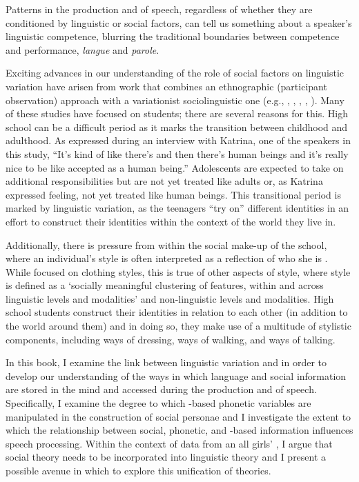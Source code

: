\noindent Patterns in the production and  of speech, regardless of whether they are conditioned by linguistic or social factors, can tell us something about a speaker's linguistic competence, blurring the traditional boundaries between competence and performance, \textit{langue} and \textit{parole}.  

Exciting advances in our understanding of the role of social factors on linguistic variation have arisen from work that combines an ethnographic (participant observation) approach with a variationist sociolinguistic one (e.g., , , , , ).  Many of these studies have focused on  students; there are several reasons for this.  High school can be a difficult period as it marks the transition between childhood and adulthood.  As expressed during an interview with Katrina, one of the speakers in this study, "`It's kind of like there's  and then there's human beings and it's really nice to be like accepted as a human being."'  Adolescents are expected to take on additional responsibilities but are not yet treated like adults or, as Katrina expressed feeling, not yet treated like human beings.  This transitional period is marked by linguistic variation, as the teenagers "`try on"' different identities in an effort to construct their identities within the context of the world they live in.

Additionally, there is pressure from within the social make-up of the school, where an individual's style is often interpreted as a reflection of who she is \cite[2]{pomerantz2008}.  While  focused on clothing styles, this is true of other aspects of style, where style is defined as a `socially meaningful clustering of features, within and across linguistic levels and modalities' \cite{campbellkibleretal2006} and non-linguistic levels and modalities. High school students construct their identities in relation to each other (in addition to the world around them) and in doing so, they make use of a multitude of stylistic components, including ways of dressing, ways of walking, and ways of talking.  

In this book, I examine the link between linguistic variation and  in order to develop our understanding of the ways in which language and social information are stored in the mind and accessed during the production and  of speech.  Specifically, I examine the degree to which -based phonetic variables are manipulated in the construction of social personae and I investigate the extent to which the relationship between social, phonetic, and -based information influences speech processing.  Within the context of data from an all girls' , I argue that social theory needs to be incorporated into linguistic theory and I present a possible avenue in which to explore this unification of theories.  

